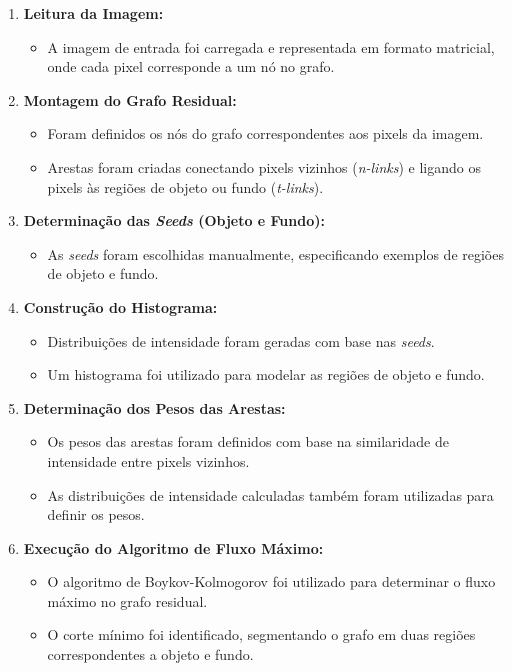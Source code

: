\documentclass[12pt]{article}
\begin{document}
\begin{enumerate}
    \item \textbf{Leitura da Imagem:} 
    \begin{itemize}
        \item A imagem de entrada foi carregada e representada em formato matricial, onde cada pixel corresponde a um nó no grafo.
    \end{itemize}

    \item \textbf{Montagem do Grafo Residual:}
    \begin{itemize}
        \item Foram definidos os nós do grafo correspondentes aos pixels da imagem.
        \item Arestas foram criadas conectando pixels vizinhos (\textit{n-links}) e ligando os pixels às regiões de objeto ou fundo (\textit{t-links}).
    \end{itemize}

    \item \textbf{Determinação das \textit{Seeds} (Objeto e Fundo):}
    \begin{itemize}
        \item As \textit{seeds} foram escolhidas manualmente, especificando exemplos de regiões de objeto e fundo.
    \end{itemize}

    \item \textbf{Construção do Histograma:}
    \begin{itemize}
        \item Distribuições de intensidade foram geradas com base nas \textit{seeds}.
        \item Um histograma foi utilizado para modelar as regiões de objeto e fundo.
    \end{itemize}

    \item \textbf{Determinação dos Pesos das Arestas:}
    \begin{itemize}
        \item Os pesos das arestas foram definidos com base na similaridade de intensidade entre pixels vizinhos.
        \item As distribuições de intensidade calculadas também foram utilizadas para definir os pesos.
    \end{itemize}

    \item \textbf{Execução do Algoritmo de Fluxo Máximo:}
    \begin{itemize}
        \item O algoritmo de Boykov-Kolmogorov foi utilizado para determinar o fluxo máximo no grafo residual.
        \item O corte mínimo foi identificado, segmentando o grafo em duas regiões correspondentes a objeto e fundo.
    \end{itemize}
\end{enumerate}
\end{document}
